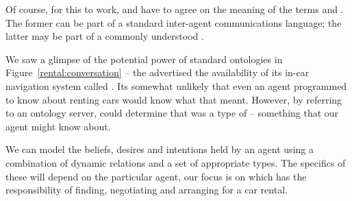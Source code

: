 Of course, for this to work,  and  have to agree on the meaning of the terms  and . The former can be part of a standard inter-agent communications language; the latter may be part of a commonly understood . 

We saw a glimpse of the potential power of standard ontologies in Figure~\vref{rental:conversation} -- the  advertised the availability of its in-car navigation system called . Its somewhat unlikely that even an agent programmed to know about renting cars would know what that meant. However, by referring to an ontology server,  could determine that  was a type of  -- something that our agent might know about.

We can model the beliefs, desires and intentions held by an agent using a combination of dynamic relations and a set of appropriate types. The specifics of these will depend on the particular agent, our focus is on  which has the responsibility of finding, negotiating and arranging for a car rental.


